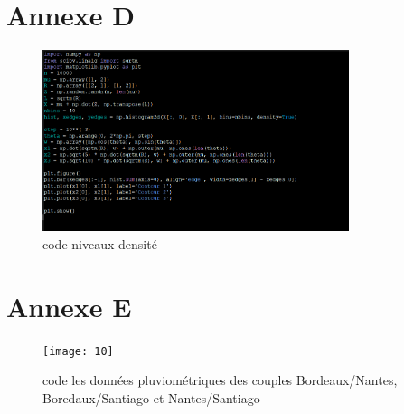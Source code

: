 \documentclass[a4paper]{article}
\begin{document}
\section{Annexe D}
\begin{figure}[h]
  \centering
  \includegraphics[width=0.8\textwidth]{8.png}
  \caption{code niveaux densité}
\end{figure}

\section{Annexe E}
\begin{figure}[h]
  \centering
  \texttt{[image: 10]}
  \caption{code les données pluviométriques des couples Bordeaux/Nantes, Boredaux/Santiago et Nantes/Santiago}
\end{figure}
\end{document}

